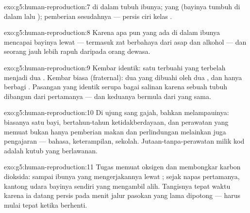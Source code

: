 \begin{solution}{exo:g5:human-reproduction:7}
 di dalam tubuh ibunya;  yang  (bayinya
tumbuh di dalam  lalu ); pemberian  sesudahnya ---
persis ciri kelas .
\end{solution}

\begin{solution}{exo:g5:human-reproduction:8}
Karena apa pun yang ada di dalam  ibunya mencapai bayinya lewat
 --- termasuk zat berbahaya dari asap dan alkohol --- dan
seorang  jauh lebih rapuh daripada orang dewasa.
\end{solution}

\begin{solution}{exo:g5:human-reproduction:9}
Kembar identik: satu  terbuahi yang terbelah menjadi dua
. Kembar biasa (fraternal): dua  yang dibuahi oleh dua
, dan hanya berbagi . Pasangan yang identik serupa
bagai salinan karena sebuah tubuh dibangun dari  pertamanya --- dan
keduanya bermula dari  yang sama.
\end{solution}

\begin{solution}{exo:g5:human-reproduction:10}
Di ujung sang gajah, bahkan melampauinya: biasanya satu bayi,
bertahun-tahun ketidakberdayaan, dan perawatan yang memuat bukan hanya
pemberian makan dan perlindungan melainkan juga pengajaran --- bahasa,
keterampilan, sekolah. Jutaan-tanpa-perawatan milik  kod adalah
kutub yang berlawanan.
\end{solution}

\begin{solution}{exo:g5:human-reproduction:11}
Tugas memuat oksigen dan membongkar karbon dioksida: sampai
  ibunya yang mengerjakannya lewat ; sejak
napas pertamanya, kantong udara  bayinya sendiri yang
mengambil alih. Tangisnya tepat waktu karena ia datang persis pada
menit jalur pasokan yang lama dipotong ---  harus mulai
tepat ketika  berhenti.
\end{solution}

